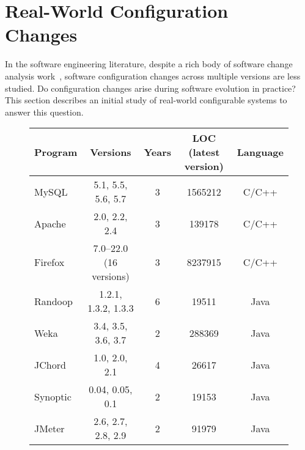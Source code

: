 \section{Real-World Configuration\\Changes}
\label{sec:study}

In the software engineering literature, despite a rich body of
software change analysis work~\cite{STVR:STVR1475, Dagenais:2008, Tao:2012:SEU}, 
software configuration changes across multiple
versions are less studied. Do configuration
changes arise during software evolution in practice?
This section describes an initial study of
\studysubjnum  real-world configurable systems to answer
this question.



\begin{figure}[t]
\vspace{1mm}
\centering
\small{
\setlength{\tabcolsep}{.40\tabcolsep}
\begin{tabular}{|l||c|c|c|c|}
\hline
 Program & Versions & Years & LOC (latest version)  & Language\\
 \hline
 \hline
 MySQL & 5.1, 5.5, 5.6, 5.7 & 3 &1565212& C/C++\\
 Apache& 2.0, 2.2, 2.4 & 3  & 139178 &C/C++\\
 Firefox& 7.0--22.0 (16 versions) & 3  & 8237915&C/C++\\
 Randoop & 1.2.1, 1.3.2, 1.3.3 & 6 & 19511   &Java\\
 Weka & 3.4, 3.5, 3.6, 3.7  & 2  & 288369 &Java\\
 JChord & 1.0, 2.0, 2.1 &  4 & 26617  &Java\\
 Synoptic & 0.04, 0.05, 0.1 & 2   & 19153 &Java\\
 JMeter & 2.6, 2.7, 2.8, 2.9& 2   & 91979 &Java\\
\hline
\end{tabular}
}
\vspace{-2mm}
\end{figure}


